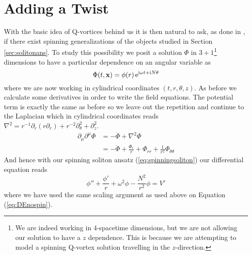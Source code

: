 \section{Adding a Twist}
With the basic idea of Q-vortices behind us it is then natural to ask, as done in \cite{spinningq}, if there exist spinning generalizations of the objects studied in Section \ref{sec:solitonans}. To study this possibility we posit a solution $\Phi$ in $3 + 1$\footnote{We are indeed working in 4-spacetime dimensions, but we are not allowing our solution to have a $z$ dependence. This is because we are attempting to model a spinning Q-vortex solution travelling in the $z$-direction.} dimensions to have a particular dependence on an angular variable as
\begin{equation}\label{eq:spinningsoliton}
\Phi(t, \mathbf{x}) = \phi(r)\,\mathrm{e}^{\mathrm{i}\omega t + \mathrm{i} N\theta}
\end{equation}
where we are now working in cylindrical coordinates $(t, r, \theta, z)$. As before we calculate some derivatives in order to write the field equations. The potential term is exactly the same as before so we leave out the repetition and continue to the Laplacian which in cylindrical coordinates reads $\nabla^2 = r^{-1}\partial_r\left(r\partial_r\right) + r^{-2}\partial_\theta^2 + \partial_z^2$.
\begin{align}
\partial_\mu\partial^\mu\Phi & = -\ddot{\Phi} + \nabla^2\Phi \\
 & = -\ddot{\Phi} + \frac{\Phi_r}{r}  + \Phi_{rr} + \frac{1}{r^2}\Phi_{\theta\theta}
\end{align}
And hence with our spinning soliton ansatz (\ref{eq:spinningsoliton}) our differential equation reads
\begin{equation}\label{eq:DE}
\phi'' + \frac{\phi'}{r} + \omega^2\phi - \frac{N^2}{r^2}\phi = V'
\end{equation}
where we have used the same scaling argument as used above on Equation (\ref{eq:DEnospin}).


